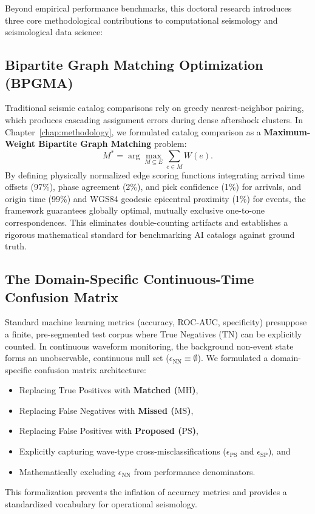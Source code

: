Beyond empirical performance benchmarks, this doctoral research introduces three core methodological contributions to computational seismology and seismological data science:

\subsection{Bipartite Graph Matching Optimization (BPGMA)}
Traditional seismic catalog comparisons rely on greedy nearest-neighbor pairing, which produces cascading assignment errors during dense aftershock clusters. In Chapter~\ref{chap:methodology}, we formulated catalog comparison as a \textbf{Maximum-Weight Bipartite Graph Matching} problem:
\begin{equation}
  M^* = \arg\max_{M \subseteq E} \sum_{e \in M} W(e).
\end{equation}
By defining physically normalized edge scoring functions integrating arrival time offsets (97\%), phase agreement (2\%), and pick confidence (1\%) for arrivals, and origin time (99\%) and WGS84 geodesic epicentral proximity (1\%) for events, the framework guarantees globally optimal, mutually exclusive one-to-one correspondences. This eliminates double-counting artifacts and establishes a rigorous mathematical standard for benchmarking AI catalogs against ground truth.

\subsection{The Domain-Specific Continuous-Time Confusion Matrix}
Standard machine learning metrics (accuracy, ROC-AUC, specificity) presuppose a finite, pre-segmented test corpus where True Negatives ($\mathrm{TN}$) can be explicitly counted. In continuous waveform monitoring, the background non-event state forms an unobservable, continuous null set ($\epsilon_{\mathrm{NN}} \equiv \emptyset$). We formulated a domain-specific confusion matrix architecture:
\begin{itemize}
  \item Replacing True Positives with \textbf{Matched ($\mathrm{MH}$)},
  \item Replacing False Negatives with \textbf{Missed ($\mathrm{MS}$)},
  \item Replacing False Positives with \textbf{Proposed ($\mathrm{PS}$)},
  \item Explicitly capturing wave-type cross-misclassifications ($\epsilon_{\mathrm{PS}}$ and $\epsilon_{\mathrm{SP}}$), and
  \item Mathematically excluding $\epsilon_{\mathrm{NN}}$ from performance denominators.
\end{itemize}
This formalization prevents the inflation of accuracy metrics and provides a standardized vocabulary for operational seismology.

